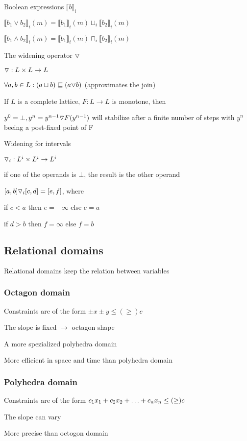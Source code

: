 \documentclass[10pt]{article}
\begin{document}
	\enumend
	\item Boolean expressions $\llbracket b\rrbracket_i$
	\enumstart
		\item $\llbracket b_1 \lor b_2 \rrbracket_i(m) = \llbracket b_1 \rrbracket_i(m) \sqcup_i \llbracket b_2\rrbracket_i(m)$
		\item $\llbracket b_1 \land b_2 \rrbracket_i(m) = \llbracket b_1 \rrbracket_i(m) \sqcap_i \llbracket b_2\rrbracket_i(m)$
	\enumend
	\item The widening operator $\triangledown$
	\enumstart
		\item $\triangledown: L \times L \rightarrow L$
		\item $\forall a, b \in L: (a \sqcup b) \sqsubseteq (a \triangledown b)$ (approximates the join)
		\item If $L$ is a complete lattice, $F: L \rightarrow L$ is monotone, then
		\item $y^0 = \bot, y^n = y^{n-1} \triangledown F(y^{n-1})$ will stabilize after a finite number of steps with $y^n$ beeing a post-fixed point of F
	\enumend
	\item Widening for intervals
	\enumstart
		\item $\triangledown_i: L^i \times L^i \rightarrow L^i$
		\item if one of the operands is $\bot$, the result is the other operand
		\item $[a,b] \triangledown_i [c,d] = [e,f]$, where
		\enumstart
			\item if $c < a$ then $e = -\infty$ else $e = a$
			\item if $d > b$ then $f = \infty$ else $f = b$
		\enumend
	\enumend
\enumend

\subsection{Relational domains}
\enumstart
	\item Relational domains keep the relation between variables
\enumend

\subsubsection{Octagon domain}
\enumstart
	\item Constraints are of the form $\pm x \pm y \le(\ge) c$
	\item The slope is fixed $\rightarrow$ octagon shape
	\item A more spezialized polyhedra domain
	\item More efficient in space and time than polyhedra domain
\enumend

\subsubsection{Polyhedra domain}
\enumstart
	\item Constraints are of the form $c_1x_1 + c_2x_2 + \mathellipsis + c_nx_n \le(\ge) c$
	\item The slope can vary
	\item More precise than octogon domain
\enumend
\end{document}
